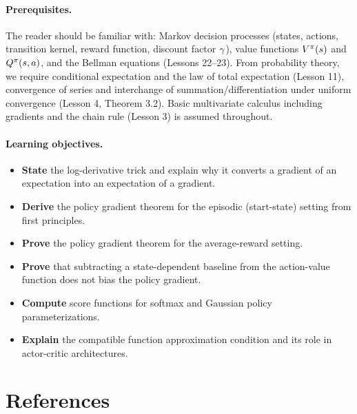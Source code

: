 \documentclass[11pt,a4paper]{article}
\begin{document}
\paragraph{Prerequisites.}
The reader should be familiar with: Markov decision processes (states,
actions, transition kernel, reward function, discount factor $\gamma$),
value functions $V^{\pi}(s)$ and $Q^{\pi}(s,a)$, and the Bellman equations
(Lessons 22--23). From probability theory, we require conditional
expectation and the law of total expectation (Lesson 11), convergence
of series and interchange of summation/differentiation under uniform
convergence (Lesson 4, Theorem 3.2). Basic multivariate calculus
including gradients and the chain rule (Lesson 3) is assumed throughout.

\paragraph{Learning objectives.}
\begin{itemize}
  \item \textbf{State} the log-derivative trick and explain why it
    converts a gradient of an expectation into an expectation of a
    gradient.
  \item \textbf{Derive} the policy gradient theorem for the episodic
    (start-state) setting from first principles.
  \item \textbf{Prove} the policy gradient theorem for the average-reward
    setting.
  \item \textbf{Prove} that subtracting a state-dependent baseline from
    the action-value function does not bias the policy gradient.
  \item \textbf{Compute} score functions for softmax and Gaussian policy
    parameterizations.
  \item \textbf{Explain} the compatible function approximation condition
    and its role in actor-critic architectures.
\end{itemize}

\section{References}
\end{document}
